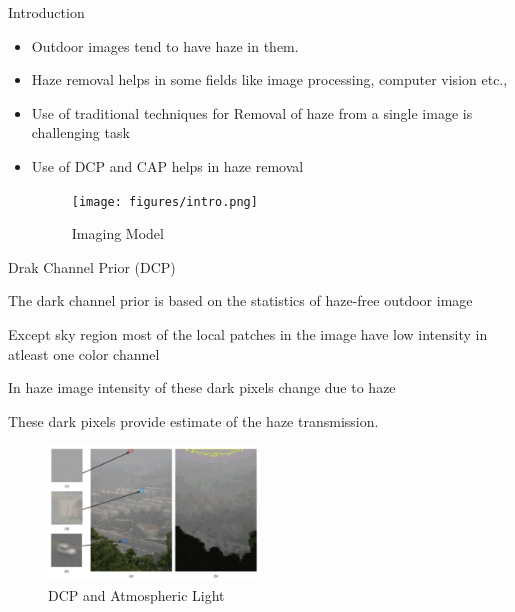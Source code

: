 \documentclass{beamer}
\begin{document}
\begin{frame}[t]{Introduction}
    
\begin{itemize}

\item {Outdoor images tend to have haze in them.}
\item {Haze removal helps in some fields like image processing, computer vision etc.,}

\item {Use of traditional techniques for Removal of haze from a single image is challenging task}
\item {Use of DCP and CAP helps in haze removal}
\pause
\begin{figure}
    \centering
    \texttt{[image: figures/intro.png]}
    \caption{Imaging Model}
\end{figure}

\end{itemize}

\end{frame}
\begin{frame}[t]{Drak Channel Prior (DCP)}

\item{The dark channel prior is based on the statistics of haze-free outdoor image}
\item{Except sky region most of the local patches in the image have low intensity in atleast one color channel}
\item{In haze image intensity of these dark pixels change due to haze}
\item{These dark pixels provide estimate of the haze transmission.}
\begin{figure}[htbp!]
    \centering
    \includegraphics[width=0.5\textwidth]{figures/dcp.pdf}
    \caption{DCP and Atmospheric Light}
\end{figure}
\end{frame}
\end{document}
